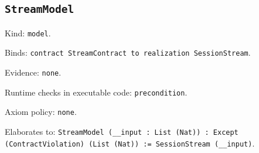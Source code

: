 \documentclass[11pt]{article}
\begin{document}
\subsection*{\texttt{StreamModel}}
\noindent Kind: \texttt{model}.\par
\noindent Binds: \texttt{contract StreamContract to realization SessionStream}.\par
\noindent Evidence: \texttt{none}.\par
\noindent Runtime checks in executable code: \texttt{precondition}.\par
\noindent Axiom policy: \texttt{none}.\par
\noindent Elaborates to: \texttt{StreamModel (\_\_input : List (Nat)) : Except (ContractViolation) (List (Nat)) := SessionStream (\_\_input)}.\par
\end{document}
